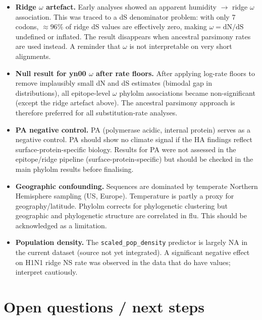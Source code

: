 \documentclass[11pt, a4paper]{article}
\begin{document}
\begin{itemize}
  \item \textbf{Ridge $\omega$ artefact.}
        Early analyses showed an apparent humidity $\rightarrow$ ridge $\omega$
        association. This was traced to a dS denominator problem: with only 7
        codons, $\approx 96\%$ of ridge dS values are effectively zero, making
        $\omega = \text{dN}/\text{dS}$ undefined or inflated.
        The result disappears when ancestral parsimony rates are used instead.
        A reminder that $\omega$ is not interpretable on very short alignments.

  \item \textbf{Null result for yn00 $\omega$ after rate floors.}
        After applying log-rate floors to remove implausibly small dN and dS
        estimates (bimodal gap in distributions), all epitope-level $\omega$
        phylolm associations became non-significant (except the ridge artefact
        above). The ancestral parsimony approach is therefore preferred for all
        substitution-rate analyses.

  \item \textbf{PA negative control.}
        PA (polymerase acidic, internal protein) serves as a negative control.
        PA should show no climate signal if the HA findings reflect
        surface-protein-specific biology. Results for PA were not assessed in
        the epitope/ridge pipeline (surface-protein-specific) but should be
        checked in the main phylolm results before finalising.

  \item \textbf{Geographic confounding.}
        Sequences are dominated by temperate Northern Hemisphere sampling
        (US, Europe). Temperature is partly a proxy for geography/latitude.
        Phylolm corrects for phylogenetic clustering but geographic and
        phylogenetic structure are correlated in flu. This should be
        acknowledged as a limitation.

  \item \textbf{Population density.}
        The \texttt{scaled\_pop\_density} predictor is largely NA in the
        current dataset (source not yet integrated). A significant negative
        effect on H1N1 ridge NS rate was observed in the data that do have
        values; interpret cautiously.
\end{itemize}

\section*{Open questions / next steps}
\end{document}
